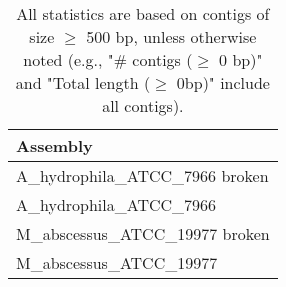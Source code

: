 \documentclass[12pt,a4paper]{article}
\begin{document}
\begin{table}[ht]
\begin{center}
\caption{All statistics are based on contigs of size $\geq$ 500 bp, unless otherwise noted (e.g., "\# contigs ($\geq$ 0 bp)" and "Total length ($\geq$ 0bp)" include all contigs).}
\begin{tabular}{|l*{0}{|r}|}
\hline
Assembly \\ \hline
A\_hydrophila\_ATCC\_7966 broken \\ \hline
A\_hydrophila\_ATCC\_7966 \\ \hline
M\_abscessus\_ATCC\_19977 broken \\ \hline
M\_abscessus\_ATCC\_19977 \\ \hline
\end{tabular}
\end{center}
\end{table}
\end{document}
